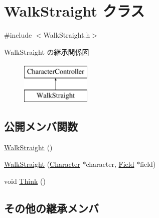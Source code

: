 \hypertarget{class_walk_straight}{\section{Walk\+Straight クラス}
\label{class_walk_straight}
}


{\ttfamily \#include $<$Walk\+Straight.\+h$>$}

Walk\+Straight の継承関係図\begin{figure}[H]
\begin{center}
\leavevmode
\includegraphics[height=2.000000cm]{class_walk_straight}
\end{center}
\end{figure}
\subsection*{公開メンバ関数}
\begin{DoxyCompactItemize}
\item 
\hyperlink{class_walk_straight_afe18d9357038b8bdb51fa79dcd522344}{Walk\+Straight} ()
\item 
\hyperlink{class_walk_straight_af47c11a0b42e6bf44edb2b4b7dc39591}{Walk\+Straight} (\hyperlink{class_character}{Character} $\ast$character, \hyperlink{class_field}{Field} $\ast$field)
\item 
void \hyperlink{class_walk_straight_ad8a6f6a0947df875c253752f72e9af0f}{Think} ()
\end{DoxyCompactItemize}
\subsection*{その他の継承メンバ}


